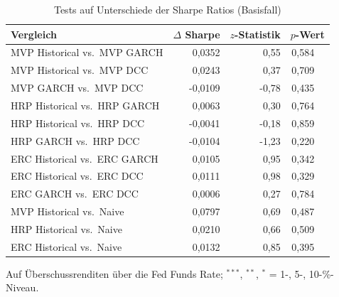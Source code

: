 \begin{table}[htbp]
  \centering
  \footnotesize
  \begin{tabular}{lrrr@{}l}
    \toprule
    Vergleich & $\Delta$ Sharpe & $z$-Statistik & \multicolumn{2}{c}{$p$-Wert} \\
    \midrule
    MVP Historical vs.\ MVP GARCH & 0,0352 & 0,55 & 0,584 &  \\
    MVP Historical vs.\ MVP DCC & 0,0243 & 0,37 & 0,709 &  \\
    MVP GARCH vs.\ MVP DCC & -0,0109 & -0,78 & 0,435 &  \\
    HRP Historical vs.\ HRP GARCH & 0,0063 & 0,30 & 0,764 &  \\
    HRP Historical vs.\ HRP DCC & -0,0041 & -0,18 & 0,859 &  \\
    HRP GARCH vs.\ HRP DCC & -0,0104 & -1,23 & 0,220 &  \\
    ERC Historical vs.\ ERC GARCH & 0,0105 & 0,95 & 0,342 &  \\
    ERC Historical vs.\ ERC DCC & 0,0111 & 0,98 & 0,329 &  \\
    ERC GARCH vs.\ ERC DCC & 0,0006 & 0,27 & 0,784 &  \\
    MVP Historical vs.\ Naive & 0,0797 & 0,69 & 0,487 &  \\
    HRP Historical vs.\ Naive & 0,0210 & 0,66 & 0,509 &  \\
    ERC Historical vs.\ Naive & 0,0132 & 0,85 & 0,395 &  \\
    \bottomrule
  \end{tabular}
  \caption{Tests auf Unterschiede der Sharpe Ratios (Basisfall)}
  \label{tab:jobson_korkie}
  \begin{minipage}{\linewidth}\vspace{0.4em}\centering\footnotesize
  Auf Überschussrenditen über die Fed Funds Rate; $^{***}$, $^{**}$, $^{*}$ = 1-, 5-, 10-\%-Niveau.
  \end{minipage}
\end{table}

